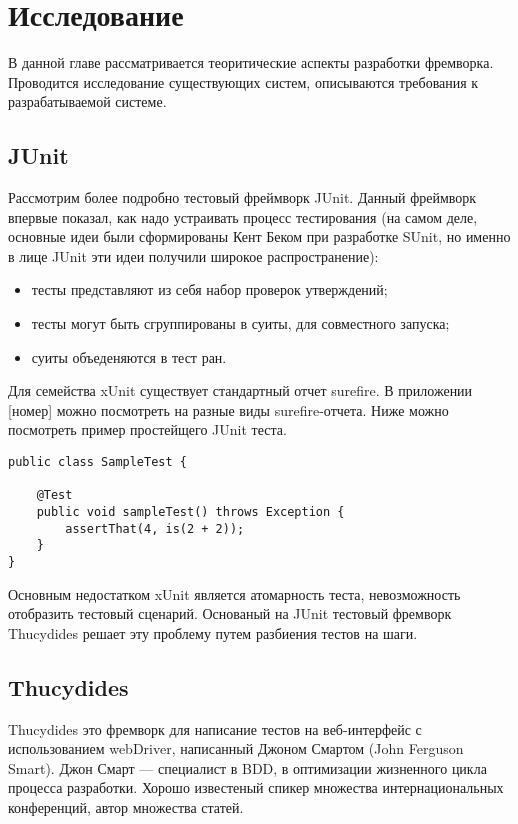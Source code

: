 \chapter{Исследование}
\label{chapter2}

В данной главе рассматривается теоритические аспекты разработки фремворка. Проводится исследование существующих систем, описываются требования к разрабатываемой системе.

\section{JUnit}

Рассмотрим более подробно тестовый фреймворк JUnit. Данный фреймворк впервые показал, как надо устраивать процесс тестирования (на самом деле, основные идеи были сформированы Кент Беком при разработке SUnit, но именно в лице JUnit эти идеи получили широкое распространение):

\begin{itemize}
\item тесты представляют из себя набор проверок утверждений;
\item тесты могут быть сгруппированы в суиты, для совместного запуска;
\item суиты объеденяются в тест ран.
\end{itemize}

Для семейства xUnit существует стандартный отчет surefire. В приложении [номер] можно посмотреть на разные виды surefire-отчета. Ниже можно посмотреть пример простейщего JUnit теста.

\begin{lstlisting}
public class SampleTest {

    @Test
    public void sampleTest() throws Exception {
        assertThat(4, is(2 + 2));
    }
}
\end{lstlisting}

Основным недостатком xUnit является атомарность теста, невозможность отобразить тестовый сценарий. Основаный на JUnit тестовый фремворк Thucydides решает эту проблему путем разбиения тестов на шаги.

\section{Thucydides}
Thucydides это фремворк для написание тестов на веб-интерфейс с использованием webDriver, написанный Джоном Смартом (John Ferguson Smart). Джон Смарт --- специалист в BDD, в оптимизации жизненного цикла процесса разработки. Хорошо известеный спикер множества интернациональных конференций, автор множества статей.

